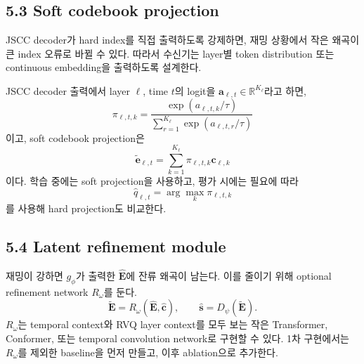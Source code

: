 \documentclass[11pt,a4paper]{article}
\begin{document}
\subsection{5.3 Soft codebook projection}
JSCC decoder가 hard index를 직접 출력하도록 강제하면, 재밍 상황에서 작은 왜곡이 큰 index 오류로 바뀔 수 있다. 따라서 수신기는 layer별 token distribution 또는 continuous embedding을 출력하도록 설계한다.

JSCC decoder 출력에서 layer $\ell$, time $t$의 logit을 $\bm{a}_{\ell,t}\in\mathbb{R}^{K_{\ell}}$라고 하면,
\begin{equation}
    \pi_{\ell,t,k}=\frac{\exp(a_{\ell,t,k}/\tau)}{\sum_{r=1}^{K_{\ell}}\exp(a_{\ell,t,r}/\tau)}
\end{equation}
이고, soft codebook projection은
\begin{equation}
    \tilde{\bm{e}}_{\ell,t}=\sum_{k=1}^{K_{\ell}}\pi_{\ell,t,k}\bm{c}_{\ell,k}
\end{equation}
이다. 학습 중에는 soft projection을 사용하고, 평가 시에는 필요에 따라
\begin{equation}
    \hat{q}_{\ell,t}=\arg\max_k \pi_{\ell,t,k}
\end{equation}
를 사용해 hard projection도 비교한다.

\subsection{5.4 Latent refinement module}
재밍이 강하면 $g_{\phi}$가 출력한 $\hat{\bm{E}}$에 잔류 왜곡이 남는다. 이를 줄이기 위해 optional refinement network $R_{\omega}$를 둔다.
\begin{equation}
    \tilde{\bm{E}} = R_{\omega}(\hat{\bm{E}},\hat{\bm{c}}), \qquad
    \hat{\bm{s}} = D_{\psi}(\tilde{\bm{E}}).
\end{equation}
$R_{\omega}$는 temporal context와 RVQ layer context를 모두 보는 작은 Transformer, Conformer, 또는 temporal convolution network로 구현할 수 있다. 1차 구현에서는 $R_{\omega}$를 제외한 baseline을 먼저 만들고, 이후 ablation으로 추가한다.
\end{document}
